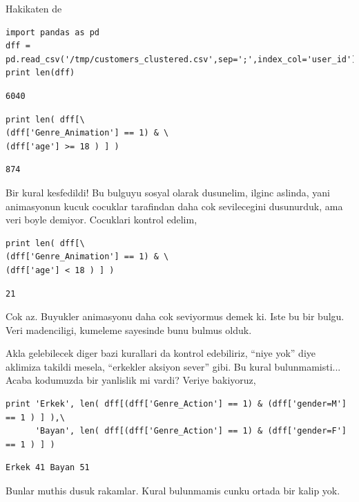 \documentclass[12pt,fleqn]{article}\usepackage{../common}
\begin{document}
Hakikaten de 

\begin{verbatim}
import pandas as pd
dff = pd.read_csv('/tmp/customers_clustered.csv',sep=';',index_col='user_id')
print len(dff)
\end{verbatim}

\begin{verbatim}
6040
\end{verbatim}

\begin{verbatim}
print len( dff[\
(dff['Genre_Animation'] == 1) & \
(dff['age'] >= 18 ) ] )
\end{verbatim}

\begin{verbatim}
874
\end{verbatim}

Bir kural kesfedildi! Bu bulguyu sosyal olarak dusunelim, ilginc aslinda,
yani animasyonun kucuk cocuklar tarafindan daha cok sevilecegini
dusunurduk, ama veri boyle demiyor. Cocuklari kontrol edelim,

\begin{verbatim}
print len( dff[\
(dff['Genre_Animation'] == 1) & \
(dff['age'] < 18 ) ] )
\end{verbatim}

\begin{verbatim}
21
\end{verbatim}

Cok az. Buyukler animasyonu daha cok seviyormus demek ki.  Iste bu bir
bulgu. Veri madenciligi, kumeleme sayesinde bunu bulmus olduk.

Akla gelebilecek diger bazi kurallari da kontrol edebiliriz, ``niye yok''
diye aklimiza takildi mesela, ``erkekler aksiyon sever'' gibi. Bu kural
bulunmamisti... Acaba kodumuzda bir yanlislik mi vardi? Veriye bakiyoruz,

\begin{verbatim}
print 'Erkek', len( dff[(dff['Genre_Action'] == 1) & (dff['gender=M'] == 1 ) ] ),\
      'Bayan', len( dff[(dff['Genre_Action'] == 1) & (dff['gender=F'] == 1 ) ] )
\end{verbatim}

\begin{verbatim}
Erkek 41 Bayan 51
\end{verbatim}

Bunlar muthis dusuk rakamlar. Kural bulunmamis cunku ortada bir kalip yok.
\end{document}
